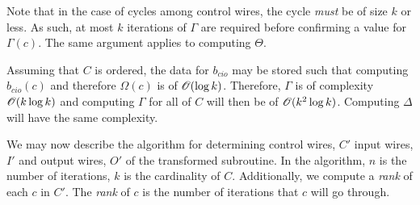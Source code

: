 Note that in the case of cycles among control wires, the cycle \emph{must} be of size $k$ or less.
As such, at most $k$ iterations of $\Gamma$ are required before confirming a value for $\Gamma(c)$.
The same argument applies to computing $\Theta$.

Assuming that $C$ is ordered, the data for $b_{cio}$ may be stored such that computing $b_{cio}(c)$
and therefore $\Omega(c)$ is of $\mathscr{O}({\log k})$. Therefore, $\Gamma$ is of complexity $\mathscr{O}({k\log
k})$ and computing $\Gamma$ for all of $C$ will then be of $\mathscr{O}({k^2 \log k})$. Computing $\Delta$
will have the same complexity.

We may now describe the algorithm for determining control wires, $C'$ input wires, $I'$ and output
wires, $O'$ of the transformed subroutine. In the algorithm, $n$ is the number of iterations, $k$
is the cardinality of $C$. Additionally, we compute a \emph{rank} of each $c$ in $C'$. The
\emph{rank} of $c$ is the number of iterations that $c$ will go through.
